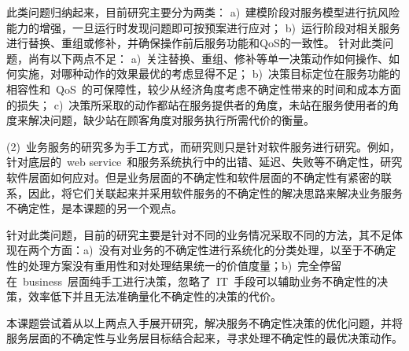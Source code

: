 此类问题归纳起来，目前研究主要分为两类：
a)~建模阶段对服务模型进行抗风险能力的增强，一旦运行时发现问题即可按预案进行应对；
b)~运行阶段对相关服务进行替换、重组或修补，并确保操作前后服务功能和QoS的一致性。
针对此类问题，尚有以下两点不足：
a)~关注替换、重组、修补等单一决策动作如何操作、如何实施，对哪种动作的效果最优的考虑显得不足；
b)~决策目标定位在服务功能的相容性和~QoS~的可保障性，较少从经济角度考虑不确定性带来的时间和成本方面的损失；
c)~决策所采取的动作都站在服务提供者的角度，未站在服务使用者的角度来解决问题，缺少站在顾客角度对服务执行所需代价的衡量。

(2)~业务服务的研究多为手工方式，而研究则只是针对软件服务进行研究。例如，针对底层的~web service~和服务系统执行中的出错、延迟、失败等不确定性，研究软件层面如何应对。但是业务层面的不确定性和软件层面的不确定性有紧密的联系，因此，将它们关联起来并采用软件服务的不确定性的解决思路来解决业务服务不确定性，是本课题的另一个观点。

针对此类问题，目前的研究主要是针对不同的业务情况采取不同的方法，其不足体现在两个方面：a)~没有对业务的不确定性进行系统化的分类处理，以至于不确定性的处理方案没有重用性和对处理结果统一的价值度量；b)~完全停留在~business~层面纯手工进行决策，忽略了~IT~手段可以辅助业务不确定性的决策，效率低下并且无法准确量化不确定性的决策的代价。

本课题尝试着从以上两点入手展开研究，解决服务不确定性决策的优化问题，并将服务层面的不确定性与业务层目标结合起来，寻求处理不确定性的最优决策动作。




